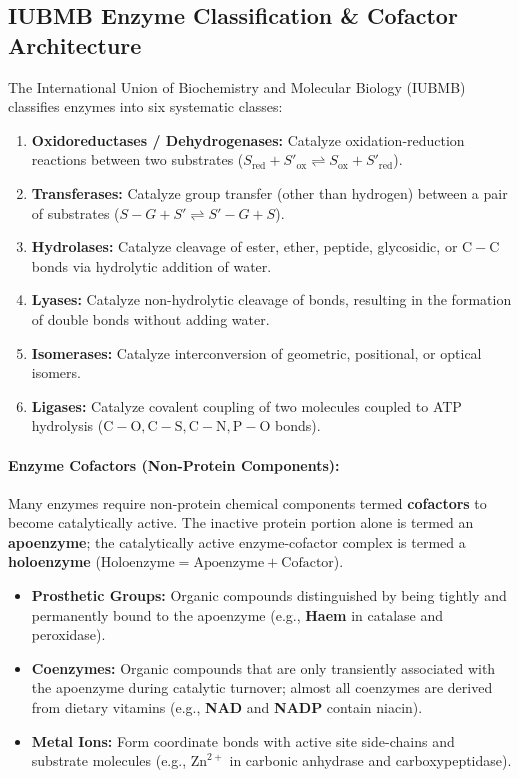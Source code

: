 \documentclass[10pt,twoside,openright]{book}
\begin{document}
\subsection{IUBMB Enzyme Classification \& Cofactor Architecture}
The International Union of Biochemistry and Molecular Biology (IUBMB) classifies enzymes into six systematic classes:
\begin{enumerate}
  \item \textbf{Oxidoreductases / Dehydrogenases:} Catalyze oxidation-reduction reactions between two substrates ($S_{\mathrm{red}} + S'_{\mathrm{ox}} \rightleftharpoons S_{\mathrm{ox}} + S'_{\mathrm{red}}$).
  \item \textbf{Transferases:} Catalyze group transfer (other than hydrogen) between a pair of substrates ($S-G + S' \rightleftharpoons S' - G + S$).
  \item \textbf{Hydrolases:} Catalyze cleavage of ester, ether, peptide, glycosidic, or $\mathrm{C-C}$ bonds via hydrolytic addition of water.
  \item \textbf{Lyases:} Catalyze non-hydrolytic cleavage of bonds, resulting in the formation of double bonds without adding water.
  \item \textbf{Isomerases:} Catalyze interconversion of geometric, positional, or optical isomers.
  \item \textbf{Ligases:} Catalyze covalent coupling of two molecules coupled to ATP hydrolysis ($\mathrm{C-O, C-S, C-N, P-O}$ bonds).
\end{enumerate}

\paragraph{Enzyme Cofactors (Non-Protein Components):}
Many enzymes require non-protein chemical components termed \textbf{cofactors} to become catalytically active. The inactive protein portion alone is termed an \textbf{apoenzyme}; the catalytically active enzyme-cofactor complex is termed a \textbf{holoenzyme} ($\text{Holoenzyme} = \text{Apoenzyme} + \text{Cofactor}$).
\begin{itemize}
  \item \textbf{Prosthetic Groups:} Organic compounds distinguished by being tightly and permanently bound to the apoenzyme (e.g., \textbf{Haem} in catalase and peroxidase).
  \item \textbf{Coenzymes:} Organic compounds that are only transiently associated with the apoenzyme during catalytic turnover; almost all coenzymes are derived from dietary vitamins (e.g., \textbf{NAD} and \textbf{NADP} contain niacin).
  \item \textbf{Metal Ions:} Form coordinate bonds with active site side-chains and substrate molecules (e.g., \textbf{$\mathrm{Zn}^{2+}$} in carbonic anhydrase and carboxypeptidase).
\end{itemize}
\end{document}
